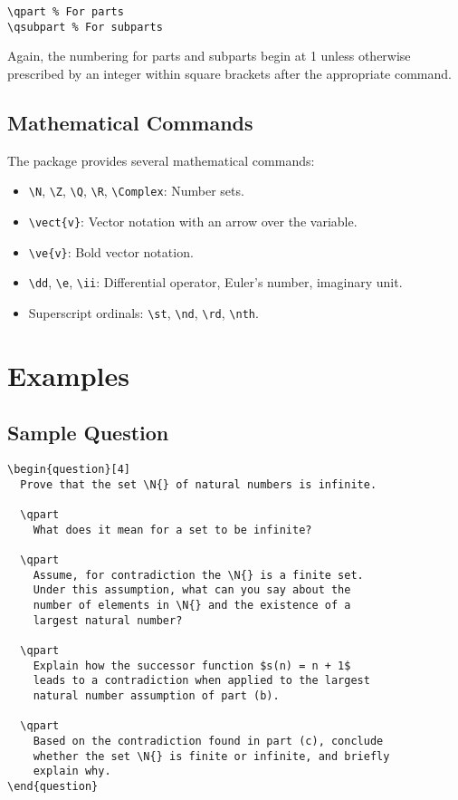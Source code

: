 \documentclass[a4paper,11pt,twoside]{article}
\begin{document}
\begin{verbatim}
\qpart % For parts
\qsubpart % For subparts
\end{verbatim}

Again, the numbering for parts and subparts begin at 1 unless otherwise prescribed by an integer within square brackets after the appropriate command.

\subsection{Mathematical Commands}

The package provides several mathematical commands:

\begin{itemize}
\item \verb|\N|, \verb|\Z|, \verb|\Q|, \verb|\R|, \verb|\Complex|: Number sets.
\item \verb|\vect{v}|: Vector notation with an arrow over the variable.
\item \verb|\ve{v}|: Bold vector notation.
\item \verb|\dd|, \verb|\e|, \verb|\ii|: Differential operator, Euler's number, imaginary unit.
\item Superscript ordinals: \verb|\st|, \verb|\nd|, \verb|\rd|, \verb|\nth|.
\end{itemize}

\section{Examples}

\subsection{Sample Question}

\begin{verbatim}
\begin{question}[4]
  Prove that the set \N{} of natural numbers is infinite.
  
  \qpart
    What does it mean for a set to be infinite?
    
  \qpart
    Assume, for contradiction the \N{} is a finite set. 
    Under this assumption, what can you say about the 
    number of elements in \N{} and the existence of a 
    largest natural number?
    
  \qpart
    Explain how the successor function $s(n) = n + 1$ 
    leads to a contradiction when applied to the largest 
    natural number assumption of part (b).
    
  \qpart
    Based on the contradiction found in part (c), conclude 
    whether the set \N{} is finite or infinite, and briefly 
    explain why.
\end{question}
\end{verbatim}
\end{document}
